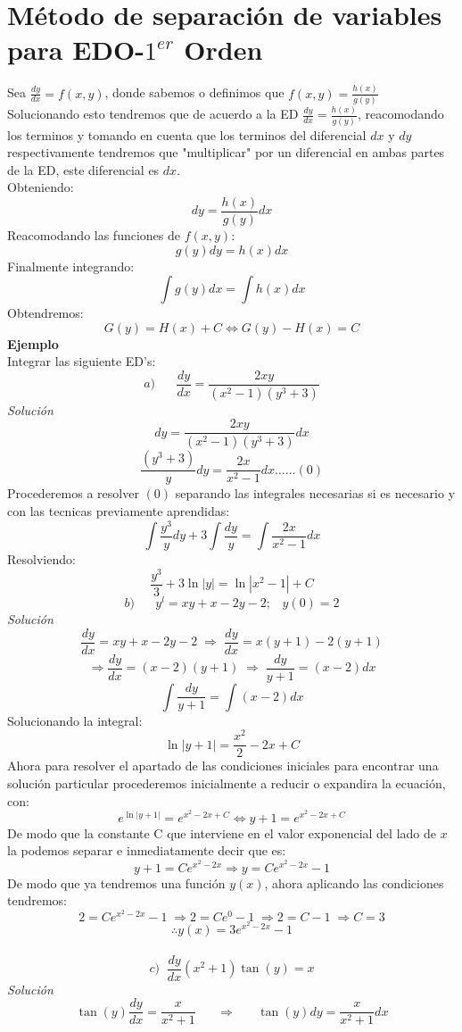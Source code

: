 \documentclass[10pt,executivepaper]{article}
\begin{document}
\section{Método de separación de variables para EDO-$1^{er}$ Orden}
Sea $\frac{dy}{dx}=f(x,y)$, donde sabemos o definimos que $f(x,y)=\frac{h(x)}{g(y)}$\\
Solucionando esto tendremos que de acuerdo a la ED $\frac{dy}{dx}=\frac{h(x)}{g(y)}$, reacomodando los terminos y tomando en cuenta que los terminos del diferencial $dx$ y $dy$ respectivamente tendremos que "multiplicar" por un diferencial en ambas partes de la ED, este diferencial es $dx$.\\
Obteniendo:
\[dy=\frac{h(x)}{g(y)}dx\]
Reacomodando las funciones de $f(x,y)$:
\[g(y)dy=h(x)dx\]
Finalmente integrando:
\[\int g(y)dx=\int h(x)dx\]
Obtendremos:
\[G(y)=H(x)+C \Leftrightarrow G(y)-H(x)=C\]
\textbf{Ejemplo}\\
Integrar las siguiente ED's:
\[a)\;\;\;\;\;\;\frac{dy}{dx}=\frac{2xy}{(x^{2}-1)(y^{3}+3)}\]
\textit{Solución}
\[dy=\frac{2xy}{(x^{2}-1)(y^{3}+3)}dx\]
\[\frac{(y^{3}+3)}{y}dy=\frac{2x}{x^{2}-1}dx \ldots\ldots(0)\]
Procederemos a resolver $(0)$ separando las integrales necesarias si es necesario y con las tecnicas previamente aprendidas:
\[\int\frac{y^{3}}{y}dy+3\int\frac{dy}{y}=\int\frac{2x}{x^{2}-1}dx\]
Resolviendo:
\[\frac{y^{3}}{3}+3\ln\left|y\right|=\ln\left|x^{2}-1\right|+C\]
\clearpage
\[b)\;\;\;\;\;\;y^{l}=xy+x-2y-2;\;\;\;y(0)=2\]
\textit{Solución}
\[\frac{dy}{dx}=xy+x-2y-2 \;\Rightarrow\;\frac{dy}{dx}=x(y+1)-2(y+1)\]
\[\Rightarrow\frac{dy}{dx}=(x-2)(y+1)\;\Rightarrow\;\frac{dy}{y+1}=(x-2)dx\]
\[\int\frac{dy}{y+1}=\int(x-2)dx\]
Solucionando la integral:
\[\ln\left|y+1\right|=\frac{x^{2}}{2}-2x+C\]
Ahora para resolver el apartado de las condiciones iniciales para encontrar una solución particular procederemos inicialmente a reducir o expandira la ecuación, con:
\[e^{\ln|y+1|}=e^{x^{2}-2x+C} \Leftrightarrow y+1=e^{x^{2}-2x+C}\]
De modo que la constante C que interviene en el valor exponencial del lado de $x$ la podemos separar e inmediatamente decir que es:
\[y+1=Ce^{x^{2}-2x}\Rightarrow y=Ce^{x^{2}-2x}-1\]
De modo que ya tendremos una función $y(x)$, ahora aplicando las condiciones tendremos:
\[2=Ce^{x^{2}-2x}-1\;\Rightarrow 2=Ce^{0}-1\;\Rightarrow 2=C-1\;\Rightarrow C=3\]
\[\therefore y(x)=3e^{x^{2}-2x}-1\]
\\\vspace{0.5cm}
\[c)\;\;\frac{dy}{dx}(x^{2}+1)\tan(y)=x\]
\textit{Solución}
\[\tan(y)\frac{dy}{dx}=\frac{x}{x^{2}+1}\;\;\;\;\;\;\Rightarrow\;\;\;\;\;\; \tan(y)dy=\frac{x}{x^{2}+1}dx\]
\end{document}
